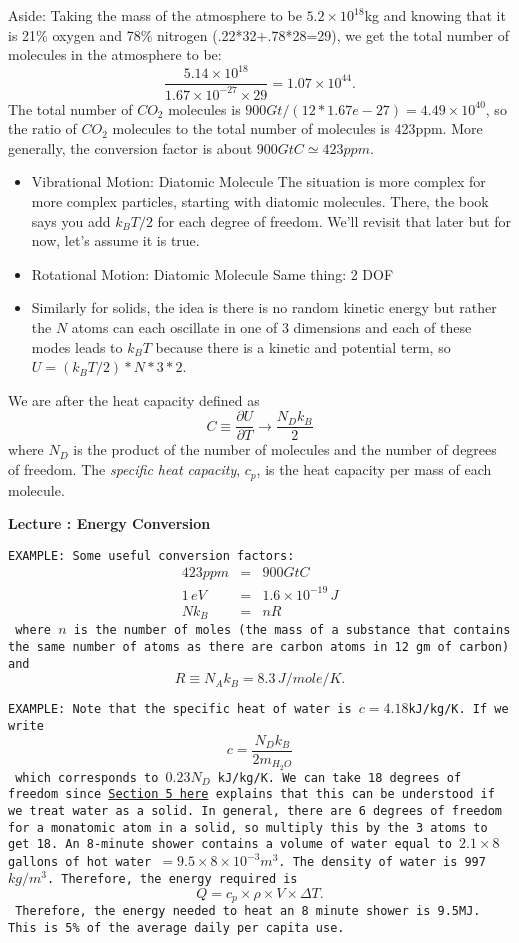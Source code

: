 \documentclass[11pt]{book}
\def\be{\begin{equation}}
\def\ee{\end{equation}}
\def\bea{\begin{eqnarray}}
\def\eea{\end{eqnarray}}
\newcommand{\vs}{\nonumber\\}
\newcommand\example[1]{{\tt EXAMPLE: #1}}
\newcommand\bei{\begin{itemize}}
\newcommand\eei{\end{itemize}}
\newcommand\lecture[1]{\newpage
\addtocounter{lectureno}{1}
\setcounter{secno}{0}
\begin{center}
 {\bf Lecture \arabic{lectureno}: #1}
\end{center}
}
\newcounter{lectureno}
\newcounter{secno}
\begin{document}
Aside: Taking the mass of the atmosphere to be $5.2\times 10^{18}$kg and knowing that it is 21\% oxygen and 78\% nitrogen (.22*32+.78*28=29), we get the total number of molecules in the atmosphere to be:
\be
\frac{5.14\times 10^{18}}{1.67\times 10^{-27}\times 29} = 1.07\times 10^{44}.\ee
The total number of $CO_2$ molecules is $900Gt/(12*1.67e-27)=4.49\times 10^{40}$, so the ratio of $CO_2$ molecules to the total number of molecules is 423ppm. More generally, the conversion factor is about $900GtC\simeq423ppm$.
\newcommand\old[1]{\bigskip {\it {\bf Old Material} #1}}

\bei
\item Vibrational Motion: Diatomic Molecule
The situation is more complex for more complex particles, starting with diatomic molecules. There, the book says you add $k_BT/2$ for each degree of freedom. We'll revisit that later but for now, let's assume it is true.
\item Rotational Motion: Diatomic Molecule
Same thing: 2 DOF
\item Similarly for solids, the idea is there is no random kinetic energy but rather the $N$ atoms can each oscillate in one of 3 dimensions and each of these modes leads to $k_BT$ because there is a kinetic and potential term, so $U=(k_BT/2)*N*3*2$. 
\eei

We are after the heat capacity defined as 
\be
C \equiv \frac{\partial U}{\partial T} \rightarrow \frac{N_Dk_B}2
\ee
where $N_D$ is the product of the number of molecules and the number of degrees of freedom. The {\it specific heat capacity}, $c_p$,  is the heat capacity per mass of each molecule.


\lecture{Energy Conversion}
\example{Some useful conversion factors:
\bea
423 ppm &=& 900 GtC
\vs
1\, eV &=& 1.6\times 10^{-19}\, J\vs
Nk_B &=& nR
\eea
where $n$ is the number of moles (the mass of a substance that contains the same number of atoms as there are carbon atoms in 12 gm of carbon) and 
\be
R\equiv N_A k_B = 8.3\, J/mole/K.\ee}


\example{
Note that the specific heat of water is $c=4.18$kJ/kg/K. If we write
\be
c = \frac{N_D k_B}{2m_{H_2O}}\ee
which corresponds to $0.23 N_D$ kJ/kg/K. We can take 18 degrees of freedom since \href{http://galileo.phys.virginia.edu/classes/304/h2o.pdf}{Section 5 here} explains that this can be understood if we treat water as a solid. In general, there are 6 degrees of freedom for a monatomic atom in a solid, so multiply this by the 3 atoms to get 18. 
An 8-minute shower contains a volume of water equal to $2.1\times 8$ gallons of hot water $=9.5\times8\times 10^{-3}m^3$.
The density of water is
997 $kg/m^3$. Therefore, the energy required is
\be
Q= c_p\times\rho\times V\times \Delta T.\ee
Therefore, the energy needed to heat an 8 minute shower is 9.5MJ. This is 5\% of the average daily per capita use.}
\end{document}
